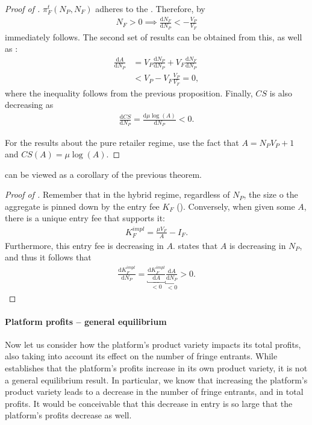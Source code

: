 \documentclass[a4paper]{article}
\newcommand{\dd}{\mathrm{d}}
\begin{document}
\begin{proof}[Proof of ]
    $\pi^t_F(N_P ,N_F)$ adheres to the .
    Therefore, by 
    \begin{align*}
        N_F > 0 \implies \frac{\dd N_F}{\dd N_P} < -\frac{V_P}{V_F}
    \end{align*}
    immediately follows.
    The second set of results can be obtained from this, as well as :
    \begin{align*}
        \frac{\dd A}{\dd N_P}& = V_P \frac{\dd N_P}{\dd N_P} + V_F \frac{\dd N_F}{\dd N_P} \\
        &< V_P - V_F \frac{V_P}{V_F} = 0,
    \end{align*}
    where the inequality follows from the previous proposition.
    Finally, $CS$ is also decreasing as
    \begin{align*}
        \frac{\dd CS}{\dd N_P} = \frac{\dd \mu \log(A)}{\dd N_P} < 0.
    \end{align*}
    
    For the results about the pure retailer regime, use the fact that $A = N_P V_P + 1$ and $CS(A) = \mu\log(A)$.
\end{proof}

 can be viewed as a corollary of the previous theorem.
\begin{proof}[Proof of ]
    Remember that in the hybrid regime, regardless of $N_P$, the size o the aggregate is pinned down by the entry fee $K_F$ ().
    Conversely, when given some $A$, there is a unique entry fee that supports it:
    \begin{align*}
        K_F^{impl} = \frac{\mu V_F}{A} - I_F.
    \end{align*}
    Furthermore, this entry fee is decreasing in $A$.
     states that $A$ is decreasing in $N_P$, and thus it follows that
    \begin{align*}
        \frac{\dd K_F^{impl}}{\dd N_P} = \underbracket{\frac{\dd K_F^{impl}}{\dd A}}_{<0} \underbracket{\frac{\dd A}{\dd N_P}}_{<0} > 0.
    \end{align*}
\end{proof}

\paragraph{Platform profits -- general equilibrium}
Now let us consider how the platform's product variety impacts its total profits, also taking into account its effect on the number of fringe entrants.
While  establishes that the platform's profits increase in its own product variety, it is not a general equilibrium result.
In particular, we know that increasing the platform's product variety leads to a decrease in the number of fringe entrants, and in total profits.
It would be conceivable that this decrease in entry is so large that the platform's profits decrease as well.
\end{document}

